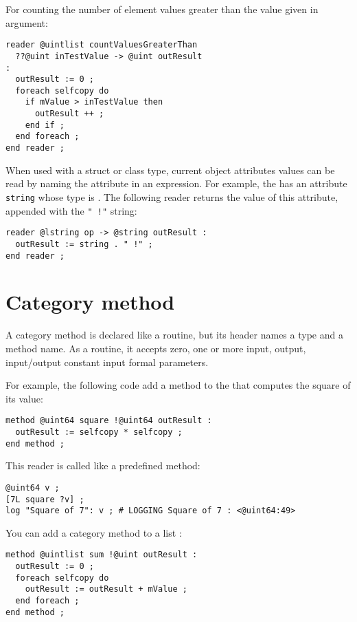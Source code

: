 For counting the number of element values greater than the value given in argument:
\begin{lstlisting}[language=galgas]
reader @uintlist countValuesGreaterThan
  ??@uint inTestValue -> @uint outResult
:
  outResult := 0 ;
  foreach selfcopy do
    if mValue > inTestValue then
      outResult ++ ;
    end if ;
  end foreach ;
end reader ;
\end{lstlisting}

When used with a struct or class type, current object attributes values can be read by naming the attribute in an expression. For example, the  has an attribute 
\lstinline[language=galgas]!string! whose type is . The following reader returns the value of this attribute, appended with the \lstinline[language=galgas]?" !"? string:
\begin{lstlisting}[language=galgas]
reader @lstring op -> @string outResult :
  outResult := string . " !" ;
end reader ;
\end{lstlisting}







\section{Category method}

A category method is declared like a routine, but its header names a type and a method name. As a routine, it accepts zero, one or more input, output, input/output constant input formal parameters.

For example, the following code add a method to the  that computes the square of its value:
\begin{lstlisting}[language=galgas]
method @uint64 square !@uint64 outResult :
  outResult := selfcopy * selfcopy ;
end method ;
\end{lstlisting}

This reader is called like a predefined method:
\begin{lstlisting}[language=galgas]
@uint64 v ;
[7L square ?v] ;
log "Square of 7": v ; # LOGGING Square of 7 : <@uint64:49>
\end{lstlisting}

You can add a category method to a list :
\begin{lstlisting}[language=galgas]
method @uintlist sum !@uint outResult :
  outResult := 0 ;
  foreach selfcopy do
    outResult := outResult + mValue ;
  end foreach ;
end method ;
\end{lstlisting}


